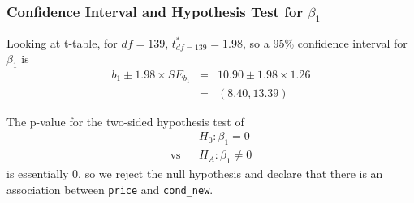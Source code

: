 \documentclass[slides]{beamer}
\newcommand{\blue}[1]{\textcolor{blue2}{#1}}
\begin{document}
\begin{frame}[fragile]
\frametitle{Confidence Interval and Hypothesis Test for $\beta_1$}
%
%
Looking at t-table, for $df=139$, $t^*_{df=139} = 1.98$, so a 95\% confidence interval for $\beta_1$ is
\begin{eqnarray*}
b_1 \pm 1.98 \times SE_{b_1} &=& 10.90 \pm 1.98 \times 1.26\\
&=& (8.40, 13.39)
\end{eqnarray*}

\pause\vspace{0.5cm}

The p-value for the two-sided hypothesis test of
\begin{eqnarray*}
&& H_0: \beta_1 = 0\\
\mbox{vs}&& H_A: \beta_1 \neq 0 
\end{eqnarray*}
is essentially 0, so we \blue{reject the null hypothesis} and declare that there is an association between {\tt price} and {\tt cond\_new}.

\end{frame}
\end{document}
